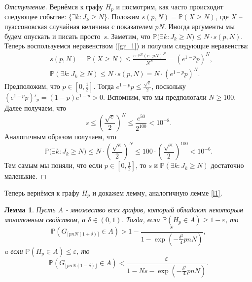 \documentclass{matmex-diploma-custom}
\newcommand{\PRob}{\mathbb P}
\newcommand{\leqs}{\leqslant}
\newcommand{\geqs}{\geqslant}
\newcommand{\eps}{\varepsilon}
\newtheorem{lemma}{Лемма}
\theoremstyle{named}
\begin{document}
\smallskip

\begin{proof}[Отступление]
Вернёмся к графу $H_p$ и посмотрим, как часто происходит следующее событие: $\{\exists k : J_k \geqs N\}$.
Положим $s(p, N) = \PRob(X \geqs N)$, где $X$ -- пуассоновская случайная величина с показателем $pN$.
Иногда аргументы мы будем опускать и писать просто~$s$.
Заметим, что $\PRob\big(\exists k : J_k \geqs N\big) \leqs N \cdot s(p, N)$. 
Теперь воспользуемся неравенством (\ref{gr_1}) и получим следующие неравенства:
\begin{align}\label{ot_1}
&s(p,N) = \PRob(X \geqs N) \leqs \frac{e^{-pN}(e\cdot pN)^N}{N^N} = (e^{1-p} p )^N,
\\ \label{s_1}
&\PRob(\exists k : J_k \geqs N) \leqs N \cdot s(p, N) = N \cdot (e^{1-p} p )^N.
\end{align} 
Предположим, что $p \in [0, \frac{1}{2}]$. Тогда $e^{1-p} p \leqs \frac{\sqrt{e}}{2}$, 
поскольку $(e^{1-p} p)'_p = (1-p) e^{1-p} > 0$. 
Вспомним, что мы предпологали $N \geqs 100$. Далее получаем, что 
\begin{equation}
s \leqs \left(\frac{\sqrt{e}}{2}\right)^N \leqs \frac{e^{50}}{2^{100}} < 10^{-8}.
\end{equation}
Аналогичным образом получаем, что 
\begin{equation}
\PRob\big(\exists k : J_k \geqs N\big) \leqs N \cdot \left(\frac{\sqrt{e}}{2}\right)^N
\leqs 100 \cdot \left(\frac{\sqrt{e}}{2}\right)^{100} < 10^{-6}.
\end{equation}
Тем самым мы поняли, что если $p \in [0, \frac{1}{2}]$, то $s$ и $\PRob(\exists k : J_k \geqs N)$ достаточно маленькие.
\end{proof}

Теперь вернёмся к графу $H_p$ и докажем лемму, аналогичную лемме \ref{l1}.

\begin{lemma} \label{l3}
Пусть $A$ - множество всех графов, который обладают некоторым монотонным свойством, а $\delta \in (0,1)$.
Тогда, если $\PRob( H_p \in A) \geqs 1 - \eps$, то
\begin{equation} \label{l3_1}
\PRob(G_{\lceil pnN(1+\delta) \rceil} \in A) > 1 - \frac{\eps}{1 - \exp\left(-\frac{\delta^2}{4}pnN\right)},
\end{equation}
a если $\PRob( H_p \in A) \leqs \eps$, то
\begin{equation}\label{l3_2}
\PRob(G_{\lfloor pnN(1-\delta) \rfloor} \in A) < \frac{\eps}{1 - Ns - \exp\left(-\frac{\delta^2}{4}pnN\right)}.
\end{equation}
\end{lemma}
\end{document}
